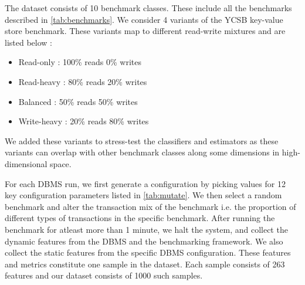 The dataset consists of 10 benchmark classes. These include all the benchmarks
described in \cref{tab:benchmarks}. We consider 4 variants of the YCSB key-value
store benchmark. These variants map to different read-write mixtures and are
listed below :\\

\begin{itemize}
  \item {Read-only : 100\% reads 0\% writes } 
  \item {Read-heavy : 80\% reads 20\% writes } 
  \item {Balanced : 50\% reads 50\% writes } 
  \item {Write-heavy : 20\% reads 80\% writes } \\
\end{itemize}

We added these variants to stress-test the classifiers and estimators as these
variants can overlap with other benchmark classes along some dimensions in
high-dimensional space. 

For each DBMS run, we first generate a configuration by picking
values for 12 key configuration parameters listed in \cref{tab:mutate}.
We then select a random benchmark and alter the transaction mix of the
benchmark i.e. the proportion of different types of transactions in 
the specific benchmark. After running the benchmark for atleast more than
1 minute, we halt the system, and collect the dynamic features from the
DBMS and the benchmarking framework. We also collect the static features
from the specific DBMS configuration. These features and metrics constitute
one sample in the dataset.
Each sample consists of 263 features and our dataset consists of 1000
such samples.

